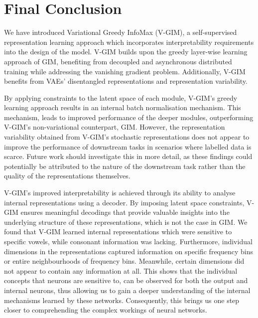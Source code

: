 



\section{Final Conclusion}
We have introduced Variational Greedy InfoMax (V-GIM), a self-supervised representation learning approach which incorporates interpretability requirements into the design of the model. V-GIM builds upon the greedy layer-wise learning approach of GIM, benefiting from decoupled and asynchronous distributed training while addressing the vanishing gradient problem. Additionally, V-GIM benefits from VAEs' disentangled representations and representation variability.

By applying constraints to the latent space of each module, V-GIM's greedy learning approach results in an internal batch normalisation mechanism. This mechanism, leads to improved performance of the deeper modules, outperforming V-GIM's non-variational counterpart, GIM. However, the representation variability obtained from V-GIM's stochastic representations does not appear to improve the performance of downstream tasks in scenarios where labelled data is scarce. Future work should investigate this in more detail, as these findings could potentially be attributed to the nature of the downstream task rather than the quality of the representations themselves.

V-GIM's improved interpretability is achieved through its ability to analyse internal representations using a decoder. By imposing latent space constraints, V-GIM ensures meaningful decodings that provide valuable insights into the underlying structure of these representations, which is not the case in GIM. We found that V-GIM learned internal representations which were sensitive to specific vowels, while consonant information was lacking. Furthermore, individual dimensions in the representations captured information on specific frequency bins or entire neighbourhoods of frequency bins. Meanwhile, certain dimensions did not appear to contain any information at all. This shows that the individual concepts that neurons are sensitive to, can be observed for both the output and internal neurons, thus allowing us to gain a deeper understanding of the internal mechanisms learned by these networks. Consequently, this brings us one step closer to comprehending the complex workings of neural networks.


